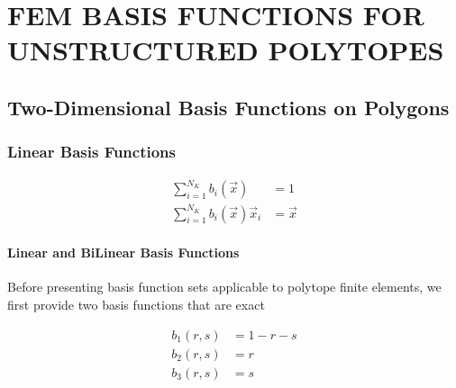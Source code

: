%
%
%
\chapter{\uppercase {FEM Basis Functions for Unstructured Polytopes}}

\section{Two-Dimensional Basis Functions on Polygons}
\label{sec::BF_2D}


\subsection{Linear Basis Functions}
\label{sec::BF_2D_Linear}

\begin{equation}
\begin{aligned}
	\sum_{i=1}^{N_K} b_i (\vec{x}) & =  1 \\
	\sum_{i=1}^{N_K} b_i(\vec{x}) \vec{x}_i & =  \vec{x}
\end{aligned}
\label{eq::linear_interp_requirements}
\end{equation}

\subsubsection{Linear and BiLinear Basis Functions}
\label{sec::BF_2D_Linear_LDandBLD}

Before presenting basis function sets applicable to polytope finite elements, we first provide two basis functions that are exact 

\begin{equation}
\label{eq::2D_lin_basis_functions}
\begin{aligned}
	b_1(r,s) & = 1-r-s \\
	b_2(r,s) & = r \\
	b_3(r,s) & = s 
\end{aligned}
\end{equation}

